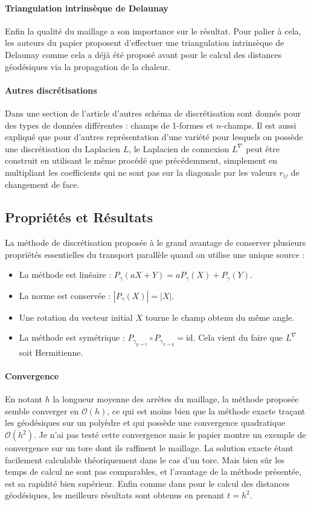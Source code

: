\documentclass[11pt]{article}
\begin{document}
	\paragraph{Triangulation intrinsèque de Delaunay}
	Enfin la qualité du maillage a son importance sur le résultat. Pour palier à cela, les auteurs du papier proposent d'effectuer une triangulation intrinsèque de Delaunay comme cela a déjà été proposé avant pour le calcul des distances géodésiques via la propagation de la chaleur.

	\paragraph{Autres discrétisations}
	Dans une section de l'article d'autres schéma de discrétisation sont donnés pour des types de données différentes : champs de 1-formes et $n$-champs. Il est aussi expliqué que pour d'autres représentation d'une variété pour lesquels on possède une discrétisation du Laplacien $L$, le Laplacien de connexion $L^\nabla$ peut être construit en utilisant le même procédé que précédemment, simplement en multipliant les coefficients qui ne sont pas sur la diagonale par les valeurs $r_{ij}$ de changement de face.
	
	\subsection{Propriétés et Résultats}
	
	La méthode de discrétisation proposée à le grand avantage de conserver plusieurs propriétés essentielles du transport parallèle quand on utilise une unique source :
	\begin{itemize}
		\item La méthode est linéaire : $P_\gamma \left( a X + Y \right) = a P_\gamma(X) + P_\gamma(Y)$.
		\item La norme est conservée : $| P_\gamma(X) | = | X |$.
		\item Une rotation du vecteur initial $X$ tourne le champ obtenu du même angle.
		\item La méthode est symétrique : $P_{\gamma_{y \rightarrow x}} \circ P_{\gamma_{x \rightarrow y}} = \text{id}$. Cela vient du faire que $L^\nabla$ soit Hermitienne.
	\end{itemize}
	
	\paragraph{Convergence}
	En notant $h$ la longueur moyenne des arrêtes du maillage, la méthode proposée semble converger en $\mathcal{O}(h)$, ce qui est moins bien que la méthode exacte traçant les géodésiques sur un polyèdre et qui possède une convergence quadratique $\mathcal{O}(h^2)$. Je n'ai pas testé cette convergence mais le papier montre un exemple de convergence sur un tore dont ils raffinent le maillage. La solution exacte étant facilement calculable théoriquement dans le cas d'un tore. Mais bien sûr les temps de calcul ne sont pas comparables, et l'avantage de la méthode présentée, est sa rapidité bien supérieur. Enfin comme dans pour le calcul des distances géodésiques, les meilleurs résultats sont obtenus en prenant $t = h^2$.
	
\end{document}
